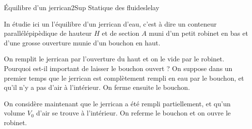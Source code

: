 
\begin{exercise}{Équilibre d'un jerrican}{2}{Sup}
{Statique des fluides}{lelay}

In étudie ici un l'équilibre d'un jerrican d'eau, c'est à dire un conteneur parallélépipèdique de hauteur $H$ et de section $A$ muni d'un petit robinet en bas et d'une grosse ouverture munie d'un bouchon en haut.
\begin{questions}
    \question On remplit le jerrican par l'ouverture du haut et on le vide par le robinet. Pourquoi est-il important de laisser le bouchon ouvert ?
    \question On suppose dans un premier temps que le jerrican est complètement rempli en eau par le bouchon, et qu'il n'y a pas d'air à l'intérieur. On ferme ensuite le bouchon.
    \question On considère maintenant que le jerrican a été rempli partiellement, et qu'un volume $V_0$ d'air se trouve à l'intérieur. On referme le bouchon et on ouvre le robinet.
\end{questions}
\end{exercise}
